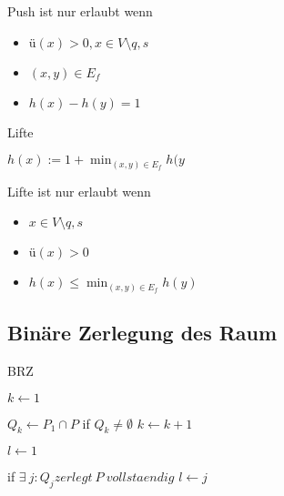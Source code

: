 Push ist nur erlaubt wenn 
	\begin{itemize}
		\item $ü(x) > 0, x \in V \setminus {q,s}$
		\item $(x,y) \in E_f$
		\item $h(x) - h(y) = 1$
	\end{itemize} 


\begin{algorithm}[H]
	\caption{Lifte}

	\Output{}
	\BlankLine

	$h(x) := 1+ \min_{(x,y) \in E_f}{h(y}$
\end{algorithm}

Lifte ist nur erlaubt wenn 
	\begin{itemize}
		\item $x \in V \setminus {q,s}$
		\item $ü(x) > 0$
		\item $h(x) \leqslant \min_{(x,y) \in E_f}{h(y)}$
	\end{itemize} 




\subsection{Binäre Zerlegung des Raum}

\begin{algorithm}[H]
	\caption{BRZ}

	\BlankLine

	$k \longleftarrow 1$

	 {
		$Q_k \longleftarrow P_1 \cap P$\newline
		if {$Q_k \neq \emptyset$} {
			$k \longleftarrow k + 1$
		}
	}

	$l \longleftarrow 1$

	if {$\exists~j: Q_j zerlegt~P~vollstaendig$} {
		$l \longleftarrow j$
	}
\end{algorithm}
